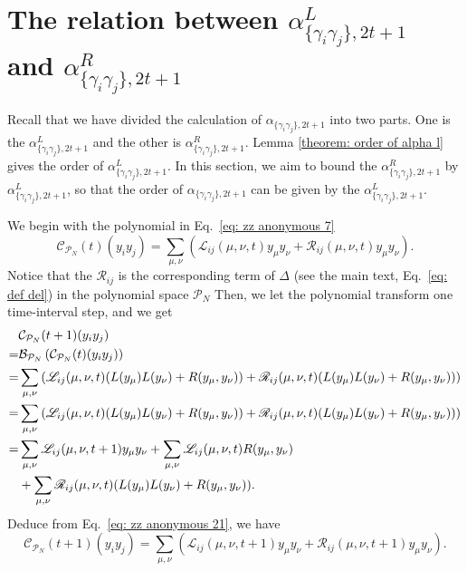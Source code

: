 \documentclass[showpacs,onecolumn,aps,prx,long bibliography,superscriptaddress,notitlepage]{revtex4-1}
\newcommand{\alpl}{\alpha_{\{\gamma_i\gamma_j\}, 2t+1}^{L}}
\newcommand{\alpr}{\alpha_{\{\gamma_i\gamma_j\}, 2t+1}^{R}}
\begin{document}
\section{The relation between $\alpl$ and $\alpr$}
\label{appendix relation between alphaL and alpha}
Recall that we have divided the calculation of $\alpha_{\{\gamma_i\gamma_j\}, 2t+1}$ into two parts. One is the $\alpl$ and the other is $\alpr$. Lemma \ref{theorem: order of alpha l} gives the order of $\alpl$. In this section, we aim to bound the $\alpr$ by $\alpl$, so that the order of $\alpha_{\{\gamma_i\gamma_j\}, 2t+1}$ can be given by the $\alpl$.

We begin with the polynomial in Eq.~\eqref{eq: zz anonymous 7}
\begin{equation}
\label{eq: zz anonymous 21}
    \mathcal{C}_{\mathcal{P}_N} (t) (y_i y_j) 
    =\sum_{\mu,\nu} \left(\mathscr{L}_{ij} (\mu, \nu, t) y_\mu y_\nu + \mathscr{R}_{ij} (\mu, \nu, t) y_\mu y_\nu\right).
\end{equation}
Notice that the $\mathscr{R}_{ij}$ is the corresponding term of $\Delta$ (see the main text, Eq.~\eqref{eq: def del}) in the polynomial space $\mathcal{P}_N$
Then, we let the polynomial transform one time-interval step, and we get
\begin{align}
    &\mathcal{C}_{\mathcal{P}_N} (t+1) (y_i y_j) \\
    =& \mathcal{B}_{\mathcal{P}_N}\left(\mathcal{C}_{\mathcal{P}_N} (t) (y_i y_j)\right) \\
    =& \sum_{\mu,\nu} \left(\mathscr{L}_{ij} (\mu, \nu, t) (L(y_\mu) L(y_\nu) + R(y_\mu, y_\nu)) + \mathscr{R}_{ij} (\mu, \nu, t) (L(y_\mu) L(y_\nu) + R(y_\mu, y_\nu))\right)\\
    =& \sum_{\mu,\nu} \left(\mathscr{L}_{ij} (\mu, \nu, t) (L(y_\mu) L(y_\nu) + R(y_\mu, y_\nu)) + \mathscr{R}_{ij} (\mu, \nu, t) (L(y_\mu) L(y_\nu) + R(y_\mu, y_\nu))\right)\\
    =& \sum_{\mu,\nu} \mathscr{L}_{ij} (\mu, \nu, t+1) y_\mu y_\nu +  \sum_{\mu,\nu}\mathscr{L}_{ij} (\mu, \nu, t) R(y_\mu, y_\nu) \nonumber\\
    & + \sum_{\mu,\nu}\mathscr{R}_{ij} (\mu, \nu, t) (L(y_\mu) L(y_\nu) + R(y_\mu, y_\nu)).
    \label{eq: zz anonymous 22}
\end{align}
Deduce from Eq.~\eqref{eq: zz anonymous 21}, we have
\begin{equation}
    \label{eq: zz anonymous 23}
    \mathcal{C}_{\mathcal{P}_N} (t+1) (y_i y_j) 
    =\sum_{\mu,\nu} \left(\mathscr{L}_{ij} (\mu, \nu, t+1) y_\mu y_\nu + \mathscr{R}_{ij} (\mu, \nu, t+1) y_\mu y_\nu\right). 
\end{equation}
\end{document}

